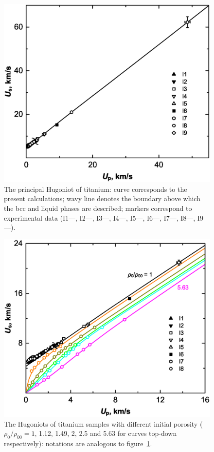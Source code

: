 \documentclass[a4paper]{jpconf}
\begin{document}
\begin{figure}[t]
\centering\includegraphics[width=0.76\columnwidth]{fig1.eps}
\caption{The principal Hugoniot of titanium: curve corresponds to the present calculations; wavy line denotes the boundary above which the bcc and liquid phases are described; markers correspond to experimental data
(I1---\!\!\cite{Walsh-Rice-McQueen-Yarger-PR-1957},
I2---\!\!\cite{McQueen-Marsh-JAP-1960},
I3---\!\!\cite{Krupnikov-Bakanova-Brazhnik-Trunin-DAN-1963},
I4---\!\!\cite{Isbell-Shipman-Jones-1968},
I5---\!\!\cite{LASL-1980},
I6---\!\!\cite{Altshuler-Bakanova-Dudoladov-Dynin-Trunin-Chekin-1981},
I7---\!\!\cite{Trunin-Panov-Medvedev-JETP-Lett-1995},
I8---\!\!\cite{Trunin-Simakov-Medvedev-HT-1999},
I9---\!\!\cite{Trunin-1994-eng, Trunin-Ilkaeva-Podurets-Popov-Pechenkin-Prokhorov-Sevastyanov-Khrustalev-HT-1994}).
\label{fig1}
}
\end{figure}

\begin{figure}[t]
\centering\includegraphics[width=0.76\columnwidth]{fig2.eps}
\caption{The Hugoniots of titanium samples with different initial porosity ($\rho_0/\rho_{00}=1$, 1.12, 1.49, 2, 2.5 and 5.63 for curves top-down respectively): notations are analogous to figure~\ref{fig1}.
\label{fig2}
}
\end{figure}
\end{document}

